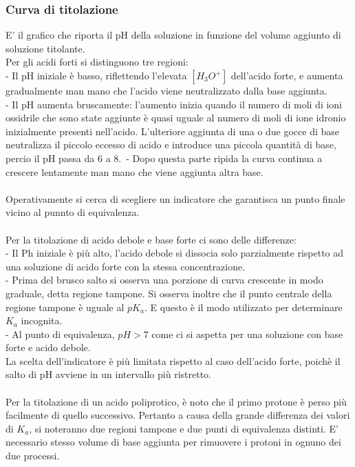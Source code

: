 \subsubsection{Curva di titolazione}
E' il grafico che riporta il pH della soluzione in funzione del volume aggiunto di soluzione titolante.\\
Per gli acidi forti si distinguono tre regioni:\\
\tab- Il pH iniziale è basso, riflettendo l'elevata $[H_3O^+]$ dell'acido forte, e aumenta gradualmente man mano che l'acido viene neutralizzato dalla base aggiunta.\\
\tab- Il pH aumenta bruscamente: l'aumento inizia quando il numero di moli di ioni ossidrile che sono state aggiunte è quasi uguale al numero di moli di ione idronio inizialmente presenti nell'acido. L'ulteriore aggiunta di una o due gocce di base neutralizza il piccolo eccesso di acido e introduce una piccola quantità di base, percio il pH passa da 6 a 8.\
\tab- Dopo questa parte ripida la curva continua a crescere lentamente man mano che viene aggiunta altra base.\\\\
Operativamente si cerca di scegliere un indicatore che garantisca un punto finale vicino al punnto di equivalenza.\\\\
Per la titolazione di acido debole e base forte ci sono delle differenze:\\
\tab- Il Ph iniziale è più alto, l'acido debole si dissocia solo parzialmente rispetto ad una soluzione di acido forte con la stessa concentrazione.\\
\tab- Prima del brusco salto si osserva una porzione di curva crescente in modo graduale, detta regione tampone. Si osserva inoltre che il punto centrale della regione tampone è uguale al $pK_a$. E questo è il modo utilizzato per determinare $K_a$ incognita.\\
\tab- Al punto di equivalenza, $pH >7$ come ci si aspetta per una soluzione con base forte e acido debole.\\
La scelta dell'indicatore è più limitata rispetto al caso dell'acido forte, poichè il salto di pH avviene in un intervallo più ristretto.\\\\
Per la titolazione di un acido poliprotico, è noto che il primo protone è perso più facilmente di quello successivo. Pertanto a causa della grande differenza dei valori di $K_a$, si noteranno due regioni tampone e due punti di equivalenza distinti. E' necessario stesso volume di base aggiunta per rimuovere i protoni in ognuno dei due processi.\\

